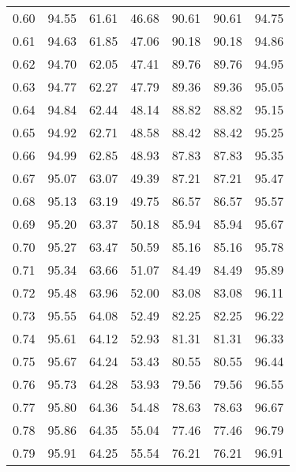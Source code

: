 \begin{tabular}{|c|c|c|c|c|c|c|}
      0.60 &     94.55 &     61.61 &      46.68 &   90.61 &      90.61 &         94.75 \\
      0.61 &     94.63 &     61.85 &      47.06 &   90.18 &      90.18 &         94.86 \\
      0.62 &     94.70 &     62.05 &      47.41 &   89.76 &      89.76 &         94.95 \\
      0.63 &     94.77 &     62.27 &      47.79 &   89.36 &      89.36 &         95.05 \\
      0.64 &     94.84 &     62.44 &      48.14 &   88.82 &      88.82 &         95.15 \\
      0.65 &     94.92 &     62.71 &      48.58 &   88.42 &      88.42 &         95.25 \\
      0.66 &     94.99 &     62.85 &      48.93 &   87.83 &      87.83 &         95.35 \\
      0.67 &     95.07 &     63.07 &      49.39 &   87.21 &      87.21 &         95.47 \\
      0.68 &     95.13 &     63.19 &      49.75 &   86.57 &      86.57 &         95.57 \\
      0.69 &     95.20 &     63.37 &      50.18 &   85.94 &      85.94 &         95.67 \\
      0.70 &     95.27 &     63.47 &      50.59 &   85.16 &      85.16 &         95.78 \\
      0.71 &     95.34 &     63.66 &      51.07 &   84.49 &      84.49 &         95.89 \\
      0.72 &     95.48 &     63.96 &      52.00 &   83.08 &      83.08 &         96.11 \\
      0.73 &     95.55 &     64.08 &      52.49 &   82.25 &      82.25 &         96.22 \\
      0.74 &     95.61 &     64.12 &      52.93 &   81.31 &      81.31 &         96.33 \\
      0.75 &     95.67 &     64.24 &      53.43 &   80.55 &      80.55 &         96.44 \\
      0.76 &     95.73 &     64.28 &      53.93 &   79.56 &      79.56 &         96.55 \\
      0.77 &     95.80 &     64.36 &      54.48 &   78.63 &      78.63 &         96.67 \\
      0.78 &     95.86 &     64.35 &      55.04 &   77.46 &      77.46 &         96.79 \\
      0.79 &     95.91 &     64.25 &      55.54 &   76.21 &      76.21 &         96.91 \\

\end{tabular}
